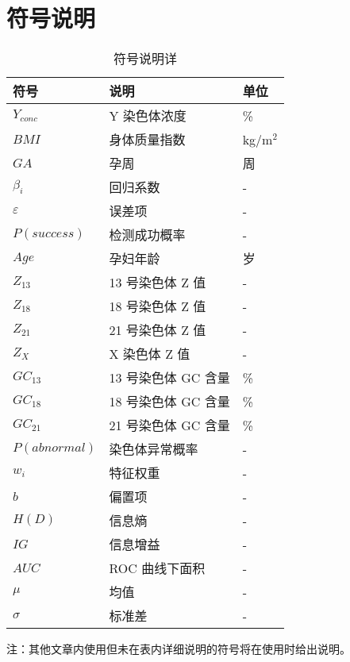 \documentclass[withoutpreface,bwprint]{cumcmthesis} %
\begin{document}
\section{符号说明}
\begin{table}[H]
    \centering  %
    \caption{符号说明详}  %
    \label{tab:符号说明}  %
    \begin{threeparttable}
        \begin{tabularx}{\textwidth}{p{} p{} l}
            \toprule[1.5pt]
            \textbf{符号} & \textbf{说明} & \textbf{单位} \\ 
            \midrule[1pt]
            $Y_{conc}$ & Y 染色体浓度 & \%  \\
            $BMI$ & 身体质量指数 & kg/m$^2$\\
            $GA$ & 孕周 & 周  \\
            $\beta_i$ & 回归系数 & -  \\
            $\varepsilon$ & 误差项 & -  \\
            $P(success)$ & 检测成功概率 & -  \\
            $Age$ & 孕妇年龄 & 岁  \\
            $Z_{13}$ & 13 号染色体 Z 值 & -  \\
            $Z_{18}$ & 18 号染色体 Z 值 & -  \\
            $Z_{21}$ & 21 号染色体 Z 值 & -  \\
            $Z_X$ & X 染色体 Z 值 & -  \\
            $GC_{13}$ & 13 号染色体 GC 含量 & \%  \\
            $GC_{18}$ & 18 号染色体 GC 含量 & \%  \\
            $GC_{21}$ & 21 号染色体 GC 含量 & \%  \\
            $P(abnormal)$ & 染色体异常概率 & -  \\
            $w_i$ & 特征权重 & -  \\
            $b$ & 偏置项 & -  \\
            $H(D)$ & 信息熵 & -  \\
            $IG$ & 信息增益 & -  \\
            $AUC$ & ROC 曲线下面积 & -  \\
            $\mu$ & 均值 & -  \\
            $\sigma$ & 标准差 & -\\
            \bottomrule[1.5pt]
        
        \end{tabularx}
        \begin{tablenotes}
            \footnotesize
            \item 注：其他文章内使用但未在表内详细说明的符号将在使用时给出说明。
        \end{tablenotes}
    \end{threeparttable}
\end{table}
\end{document}
